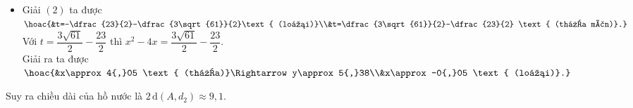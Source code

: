 \begin{bt}
{\begin{itemize}
			\item Giải $(2)$ ta được $\hoac{&t=-\dfrac{23}{2}-\dfrac{3\sqrt{61}}{2}\text{ (loại)}\\&t=\dfrac{3\sqrt{61}}{2}-\dfrac{23}{2} \text{ (thỏa mãn)}.}$\\
			Với $t=\dfrac{3\sqrt{61}}{2}-\dfrac{23}{2}$ thì $x^2-4x=\dfrac{3\sqrt{61}}{2}-\dfrac{23}{2}$.\\
			Giải ra ta được $\hoac{&x\approx4{,}05 \text{ (thỏa)}\Rightarrow y\approx5{,}38\\&x\approx -0{,}05 \text{ (loại)}.}$
		\end{itemize}
		Suy ra chiều dài của hồ nước là $2\mathrm{\,d}(A,d_2)\approx 9{,}1$.
	}
\end{bt}

